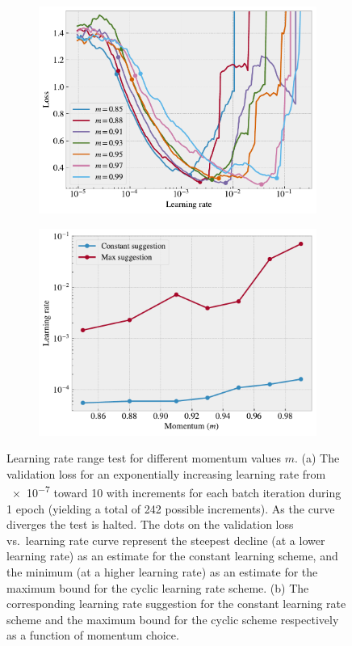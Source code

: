 \begin{figure}[!htb]
  \centering
  \begin{subfigure}[t]{0.49\textwidth}
      \centering
      \includegraphics[width=\textwidth]{figures/ML/LR_momentum_test_a.pdf}
      \caption{}
  \end{subfigure}
  \hfill
  \begin{subfigure}[t]{0.49\textwidth}
      \centering
      \includegraphics[width=\textwidth]{figures/ML/LR_momentum_test_b.pdf}
      \caption{}
  \end{subfigure}
  \hfill
  \caption{Learning rate range test for different momentum values $m$. (a) The validation loss for an exponentially increasing learning rate from \num{e-7} toward 10 with increments for each batch iteration during 1 epoch (yielding a total of 242 possible increments). As the curve diverges the test is halted. The dots on the validation loss vs.\ learning rate curve represent the steepest decline (at a lower learning rate) as an estimate for the constant learning scheme, and the minimum (at a higher learning rate) as an estimate for the maximum bound for the cyclic learning rate scheme. (b) The corresponding learning rate suggestion for the constant learning rate scheme and the maximum bound for the cyclic scheme respectively as a function of momentum choice. }
  \label{fig:LR_range_mom}
\end{figure}


